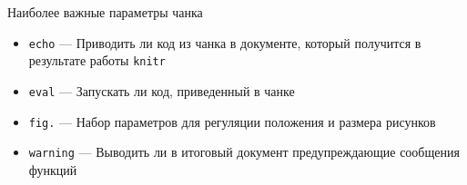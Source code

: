 \documentclass[
  10pt,
  ignorenonframetext,
  aspectratio=169,t,xcolor=table]{beamer}
\providecommand{\tightlist}{%
  \setlength{\itemsep}{0pt}\setlength{\parskip}{0pt}}
\begin{document}
\begin{frame}[fragile]{Наиболее важные параметры чанка}
\protect\hypertarget{ux43dux430ux438ux431ux43eux43bux435ux435-ux432ux430ux436ux43dux44bux435-ux43fux430ux440ux430ux43cux435ux442ux440ux44b-ux447ux430ux43dux43aux430}{}
\begin{itemize}
\tightlist
\item
  \texttt{echo} --- Приводить ли код из чанка в документе, который
  получится в результате работы \texttt{knitr}
\item
  \texttt{eval} --- Запускать ли код, приведенный в чанке
\item
  \texttt{fig.} --- Набор параметров для регуляции положения и размера
  рисунков
\item
  \texttt{warning} --- Выводить ли в итоговый документ предупреждающие
  сообщения функций
\end{itemize}
\end{frame}

\begin{frame}
\end{frame}
\end{document}
